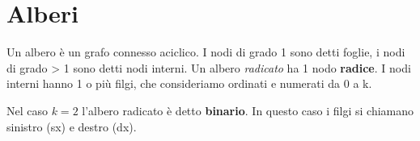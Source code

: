 \documentclass{article}
\begin{document}
\section{Alberi}

Un albero è un grafo connesso aciclico. I nodi di grado 1 sono detti foglie, i nodi di grado > 1 sono detti nodi interni.
Un albero \emph{radicato} ha 1 nodo \textbf{radice}.
I nodi interni hanno 1 o più filgi, che consideriamo ordinati e numerati da 0 a k.

Nel caso \(k = 2\) l'albero radicato è detto \textbf{binario}. In questo caso i filgi si chiamano sinistro (sx) e destro (dx).


\section{}
\end{document}
